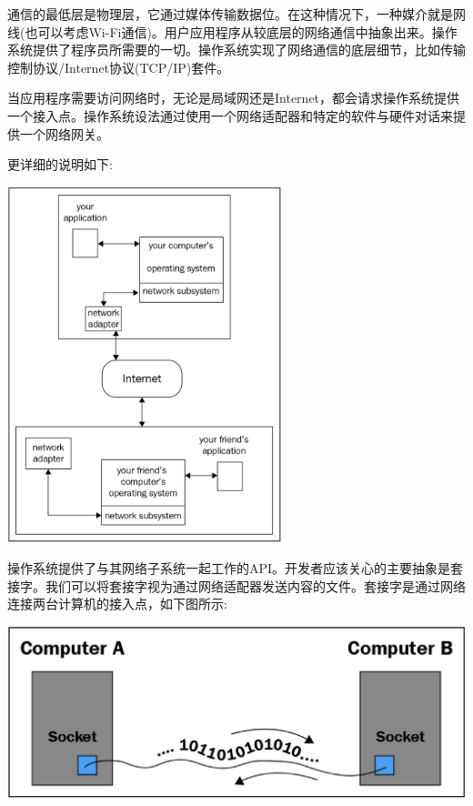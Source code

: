 通信的最低层是物理层，它通过媒体传输数据位。在这种情况下，一种媒介就是网线(也可以考虑Wi-Fi通信)。用户应用程序从较底层的网络通信中抽象出来。操作系统提供了程序员所需要的一切。操作系统实现了网络通信的底层细节，比如传输控制协议/Internet协议(TCP/IP)套件。 \par
当应用程序需要访问网络时，无论是局域网还是Internet，都会请求操作系统提供一个接入点。操作系统设法通过使用一个网络适配器和特定的软件与硬件对话来提供一个网络网关。 \par
更详细的说明如下: \par

\begin{center}
	\includegraphics[width=0.6\textwidth]{content/Section-2/Chapter-12/3}
\end{center}

操作系统提供了与其网络子系统一起工作的API。开发者应该关心的主要抽象是套接字。我们可以将套接字视为通过网络适配器发送内容的文件。套接字是通过网络连接两台计算机的接入点，如下图所示: \par

\begin{center}
	\includegraphics[width=1.0\textwidth]{content/Section-2/Chapter-12/4}
\end{center}

